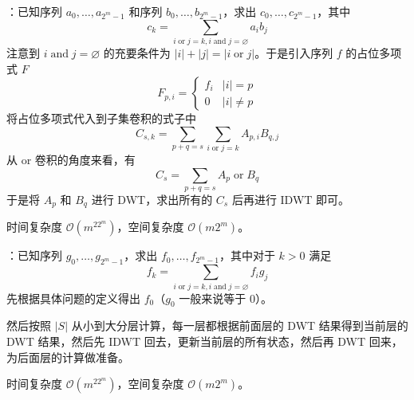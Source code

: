 ：已知序列 $a_0, \dots, a_{2^m - 1}$ 和序列 $b_0, \dots, b_{2^m - 1}$，求出 $c_0, \dots, c_{2^m - 1}$，其中
\[
c_k = \sum_{i \operatorname{or} j = k, i \operatorname{and} j = \varnothing} a_ib_j
\]
注意到 $i \operatorname{and} j = \varnothing$ 的充要条件为 $|i| + |j| = |i \operatorname{or} j|$。于是引入序列 $f$ 的占位多项式 $F$
\[
F_{p, i} = \begin{cases}
f_i & |i| = p\\
0 & |i| \neq p
\end{cases}
\]
将占位多项式代入到子集卷积的式子中
\[
C_{s, k} = \sum_{p + q = s} \sum_{i \operatorname{or} j = k}A_{p, i}B_{q, j}
\]
从 or 卷积的角度来看，有
\[
C_s = \sum_{p + q = s}A_p \operatorname{or} B_q
\]
于是将 $A_p$ 和 $B_q$ 进行 DWT，求出所有的 $C_s$ 后再进行 IDWT 即可。

时间复杂度 $\mathcal{O}(m^22^m)$，空间复杂度 $\mathcal{O}(m2^m)$。


：已知序列 $g_0, \dots, g_{2^m - 1}$，求出 $f_0, \dots, f_{2^m - 1}$，其中对于 $k > 0$ 满足
\[
f_k = \sum_{i \operatorname{or} j = k, i \operatorname{and} j = \varnothing} f_ig_j
\]
先根据具体问题的定义得出 $f_0$（$g_0$ 一般来说等于 $0$）。

然后按照 $|S|$ 从小到大分层计算，每一层都根据前面层的 DWT 结果得到当前层的 DWT 结果，然后先 IDWT 回去，更新当前层的所有状态，然后再 DWT 回来，为后面层的计算做准备。

时间复杂度 $\mathcal{O}(m^22^m)$，空间复杂度 $\mathcal{O}(m2^m)$。


